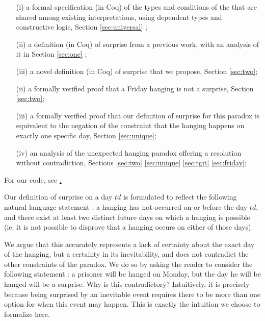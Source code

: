 \documentclass[journal]{journal}
\begin{document}
\begin{itemize}
  \item[(i)] a formal specification (in Coq) of the types and conditions of the that
  are shared among existing interpretations, using dependent types and constructive logic,
  Section \ref{sec:universal} ;
  \item[(ii)] a definition (in Coq) of surprise from a previous work, with an analysis of it
  in Section \ref{sec:one} ;
  \item[(iii)] a novel definition (in Coq) of surprise that we propose,
  Section \ref{sec:two};
  \item[(ii)] a formally verified proof that a Friday hanging is not a surprise, Section \ref{sec:two};
  \item[(iii)] a formally verified proof that our definition of
  surprise for this paradox is equivalent to the negation of the
  constraint that the hanging happens on exactly one specific day, Section \ref{sec:unique};
  \item[(iv)] an analysis of the unexpected hanging paradox offering a resolution without
  contradiction, Sections \ref{sec:two} \ref{sec:unique} \ref{sec:tgit} \ref{sec:friday};
\end{itemize}

For our code, see \href{https://github.com/polinavino/unexpected_hanging/blob/master/unexpected_hanging.v}.

Our definition of surprise on a day $td$ is formulated to reflect
the following natural language statement : a hanging has not occurred on or before the day $td$,
and there exist at least two distinct future days on which a hanging
is possible (ie. it is not possible to disprove that a hanging occurs on either
of those days).

We argue that this accurately represents a lack of certainty about the exact day of
the hanging, but a certainty in its inevitability, and does not contradict
the other constraints of the paradox. We do so by asking the reader to consider the following
statement : a prisoner will be hanged on Monday, but the day he will be hanged will
be a surprise. Why is this contradictory? Intuitively, it is precisely because
being surprised by an inevitable event requires there to be more than one option for
when this event may happen. This is exactly the intuition we choose to formalize here.
\end{document}
